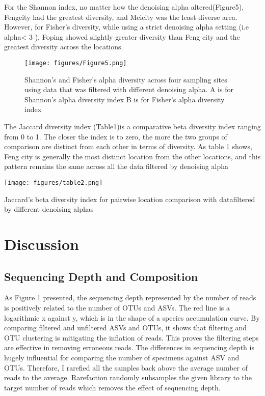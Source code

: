 \documentclass[11pt, a4paper]{article}
\begin{document}
For the Shannon index, no matter how the denoising alpha altered(Figure5), Fengcity had the greatest diversity, and Meicity was the least diverse area. However, for Fisher’s diversity, while using a strict denoising alpha setting (i.e alpha< 3 ), Foping showed slightly greater diversity than Feng city and the greatest diversity across the locations.
\begin{figure}
    \centering
    \texttt{[image: figures/Figure5.png]}
    \caption{Shannon’s and Fisher’s alpha diversity across four sampling sites using data that was filtered with different denoising alpha. A is for Shannon’s alpha diversity index B is for Fisher’s alpha diversity index}
    \label{fig5}
\end{figure}
The Jaccard diversity index (Table1)is a comparative beta diversity index ranging from 0 to 1. The closer the index is to zero, the more the two groups of comparison are distinct from each other in terms of diversity. As table 1 shows, Feng city is generally the most distinct location from the other locations, and this pattern remains the same across all the data filtered by denoising alpha
\begin{table}
    \centering
    \texttt{[image: figures/table2.png]}
    \caption{Jaccard’s beta diversity index for pairwise location comparison with datafiltered by different denoising alphas}
    \label{fig:my_label}
\end{table}

\section{Discussion}
\subsection{Sequencing Depth and Composition}
As Figure 1 presented, the  sequencing depth represented by the number of  reads  is positively related to the number of OTUs and ASVs. The red line is a logarithmic x against y, which is in the shape of a species accumulation curve. By comparing filtered and unfiltered ASVs and OTUs, it shows that filtering and OTU clustering is mitigating the inflation of reads. This proves the filtering steps are effective in removing erroneous reads. The differences in sequencing depth is hugely influential for comparing the number of specimens against ASV and OTUs. Therefore, I rarefied all the samples back above the  average number of reads to the average. Rarefaction randomly subsamples the given library to the target number of reads\cite{Hurlbert1971}  which removes the effect of sequencing depth. 
\end{document}
